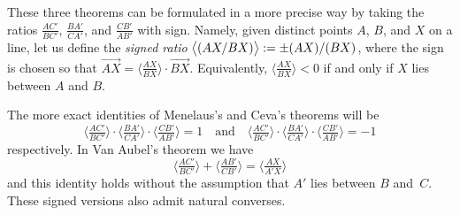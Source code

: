 These three theorems can be formulated in a more precise way by taking the ratios $\frac{AC'}{BC'}$, $\frac{BA'}{CA'}$, and $\frac{CB'}{AB'}$ with sign.
Namely, given distinct points $A$, $B$, and $X$ on a line, let us define the \emph{signed ratio} $\bigl\langle(AX/BX)\bigr\rangle:=\pm(AX)/(BX)$, where the sign is chosen so that
$\overrightarrow{AX}=\bigl\langle\frac{AX}{BX}\bigr\rangle\cdot \overrightarrow{BX}$.
Equivalently, $\bigl\langle\tfrac{AX}{BX}\bigr\rangle<0$ if and only if $X$ lies between $A$ and $B$.

The more exact identities of Menelaus's and Ceva's theorems will be
\[\bigl\langle\tfrac{AC'}{BC'}\bigr\rangle\cdot\bigl\langle\tfrac{BA'}{CA'}\bigr\rangle\cdot \bigl\langle\tfrac{CB'}{AB'}\bigr\rangle=1
\quad\text{and}\quad
\bigl\langle\tfrac{AC'}{BC'}\bigr\rangle\cdot\bigl\langle\tfrac{BA'}{CA'}\bigr\rangle\cdot \bigl\langle\tfrac{CB'}{AB'}\bigr\rangle=-1
\]
respectively.
In Van Aubel's theorem we have
\[\bigl\langle\tfrac{AC'}{BC'}\bigr\rangle+\bigl\langle\tfrac{AB'}{CB'}\bigr\rangle=\bigl\langle\tfrac{AX}{A'X}\bigr\rangle\]
and this identity holds without the assumption that $A'$ lies between $B$ and~$C$.
These signed versions also admit natural converses.

